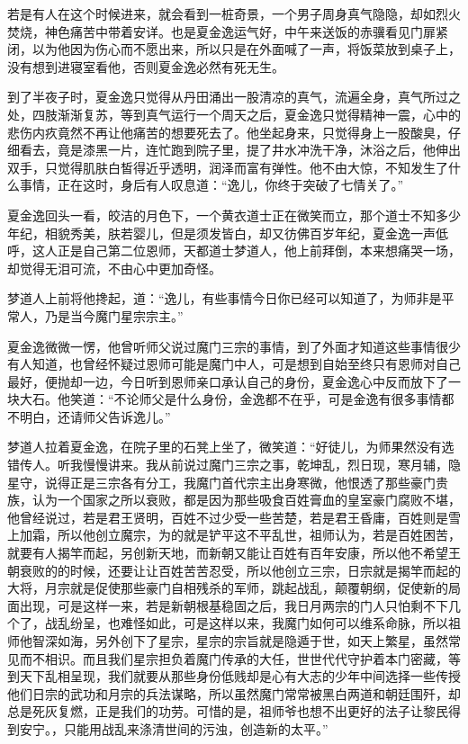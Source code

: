 若是有人在这个时候进来，就会看到一桩奇景，一个男子周身真气隐隐，却如烈火焚烧，神色痛苦中带着安详。也是夏金逸运气好，中午来送饭的赤骥看见门扉紧闭，以为他因为伤心而不愿出来，所以只是在外面喊了一声，将饭菜放到桌子上，没有想到进寝室看他，否则夏金逸必然有死无生。

到了半夜子时，夏金逸只觉得从丹田涌出一股清凉的真气，流遍全身，真气所过之处，四肢渐渐复苏，等到真气运行一个周天之后，夏金逸只觉得精神一震，心中的悲伤内疚竟然不再让他痛苦的想要死去了。他坐起身来，只觉得身上一股酸臭，仔细看去，竟是漆黑一片，连忙跑到院子里，提了井水冲洗干净，沐浴之后，他伸出双手，只觉得肌肤白皙得近乎透明，润泽而富有弹性。他不由大惊，不知发生了什么事情，正在这时，身后有人叹息道：“逸儿，你终于突破了七情关了。”

夏金逸回头一看，皎洁的月色下，一个黄衣道士正在微笑而立，那个道士不知多少年纪，相貌秀美，肤若婴儿，但是须发皆白，却又彷佛百岁年纪，夏金逸一声低呼，这人正是自己第二位恩师，天都道士梦道人，他上前拜倒，本来想痛哭一场，却觉得无泪可流，不由心中更加奇怪。

梦道人上前将他搀起，道：“逸儿，有些事情今日你已经可以知道了，为师非是平常人，乃是当今魔门星宗宗主。”

夏金逸微微一愣，他曾听师父说过魔门三宗的事情，到了外面才知道这些事情很少有人知道，也曾经怀疑过恩师可能是魔门中人，可是想到自始至终只有恩师对自己最好，便抛却一边，今日听到恩师亲口承认自己的身份，夏金逸心中反而放下了一块大石。他笑道：“不论师父是什么身份，金逸都不在乎，可是金逸有很多事情都不明白，还请师父告诉逸儿。”

梦道人拉着夏金逸，在院子里的石凳上坐了，微笑道：“好徒儿，为师果然没有选错传人。听我慢慢讲来。我从前说过魔门三宗之事，乾坤乱，烈日现，寒月辅，隐星守，说得正是三宗各有分工，我魔门首代宗主出身寒微，他恨透了那些豪门贵族，认为一个国家之所以衰败，都是因为那些吸食百姓膏血的皇室豪门腐败不堪，他曾经说过，若是君王贤明，百姓不过少受一些苦楚，若是君王昏庸，百姓则是雪上加霜，所以他创立魔宗，为的就是铲平这不平乱世，祖师认为，若是百姓困苦，就要有人揭竿而起，另创新天地，而新朝又能让百姓有百年安康，所以他不希望王朝衰败的的时候，还要让让百姓苦苦忍受，所以他创立三宗，日宗就是揭竿而起的大将，月宗就是促使那些豪门自相残杀的军师，跳起战乱，颠覆朝纲，促使新的局面出现，可是这样一来，若是新朝根基稳固之后，我日月两宗的门人只怕剩不下几个了，战乱纷呈，也难怪如此，可是这样以来，我魔门如何可以维系命脉，所以祖师他智深如海，另外创下了星宗，星宗的宗旨就是隐遁于世，如天上繁星，虽然常见而不相识。而且我们星宗担负着魔门传承的大任，世世代代守护着本门密藏，等到天下乱相呈现，我们就要从那些身份低贱却是心有大志的少年中间选择一些传授他们日宗的武功和月宗的兵法谋略，所以虽然魔门常常被黑白两道和朝廷围歼，却总是死灰复燃，正是我们的功劳。可惜的是，祖师爷也想不出更好的法子让黎民得到安宁。，只能用战乱来涤清世间的污浊，创造新的太平。”

